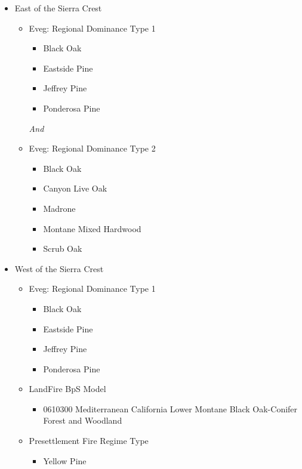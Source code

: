 \begin{itemize}
	\item East of the Sierra Crest
	\begin{itemize}
		\item Eveg: Regional Dominance Type 1
		\begin{itemize}
			\item Black Oak
			\item Eastside Pine
			\item Jeffrey Pine
			\item Ponderosa Pine
		\end{itemize}
		\emph{And}
		\item Eveg: Regional Dominance Type 2
		\begin{itemize}
			\item Black Oak
			\item Canyon Live Oak
			\item Madrone
			\item Montane Mixed Hardwood
			\item Scrub Oak
		\end{itemize}
	\end{itemize}

	\item West of the Sierra Crest
	\begin{itemize}
		\item Eveg: Regional Dominance Type 1
		\begin{itemize}
			\item Black Oak
			\item Eastside Pine
			\item Jeffrey Pine
			\item Ponderosa Pine
		\end{itemize}

		\item LandFire BpS Model
		\begin{itemize}
			\item 0610300 Mediterranean California Lower Montane Black Oak-Conifer Forest and Woodland
		\end{itemize}
		
		\item Presettlement Fire Regime Type
		\begin{itemize}
			\item Yellow Pine
		\end{itemize}
\end{itemize}
\end{itemize}


